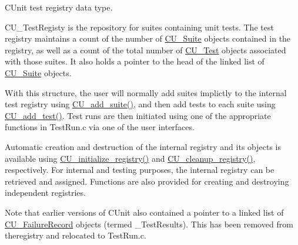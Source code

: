C\-Unit test registry data type. 

C\-U\-\_\-\-Test\-Registy is the repository for suites containing unit tests. The test registry maintains a count of the number of \hyperlink{structCU__Suite}{C\-U\-\_\-\-Suite} objects contained in the registry, as well as a count of the total number of \hyperlink{structCU__Test}{C\-U\-\_\-\-Test} objects associated with those suites. It also holds a pointer to the head of the linked list of \hyperlink{structCU__Suite}{C\-U\-\_\-\-Suite} objects. \par
\par


With this structure, the user will normally add suites implictly to the internal test registry using \hyperlink{group__Framework_ga94b8f1bbbd93b154a60bb1d43391b48a}{C\-U\-\_\-add\-\_\-suite()}, and then add tests to each suite using \hyperlink{group__Framework_gad9f198a8a5fa8cc6870c3c8be873869f}{C\-U\-\_\-add\-\_\-test()}. Test runs are then initiated using one of the appropriate functions in Test\-Run.\-c via one of the user interfaces.\par
\par


Automatic creation and destruction of the internal registry and its objects is available using \hyperlink{group__Framework_ga3477b2d3e57c8f8aba36bbbdfa54920d}{C\-U\-\_\-initialize\-\_\-registry()} and \hyperlink{group__Framework_ga183eb7d7f79e149c767237cfef52cb82}{C\-U\-\_\-cleanup\-\_\-registry()}, respectively. For internal and testing purposes, the internal registry can be retrieved and assigned. Functions are also provided for creating and destroying independent registries.\par
\par


Note that earlier versions of C\-Unit also contained a pointer to a linked list of \hyperlink{structCU__FailureRecord}{C\-U\-\_\-\-Failure\-Record} objects (termed \-\_\-\-Test\-Results). This has been removed from theregistry and relocated to Test\-Run.\-c.


